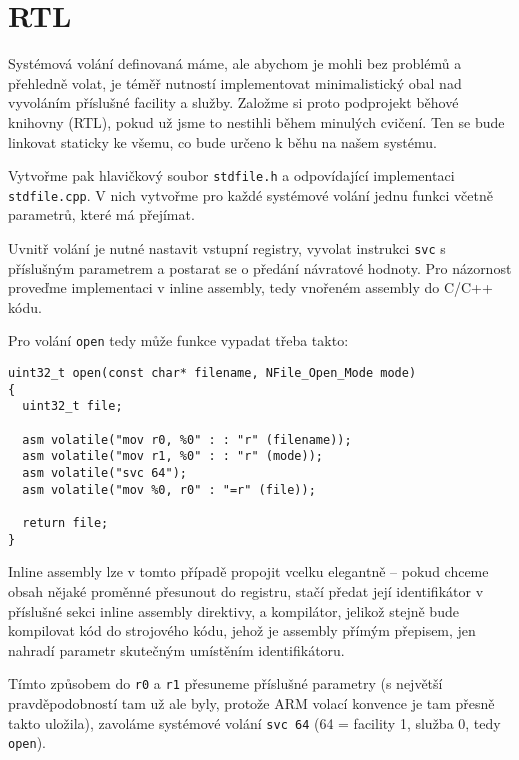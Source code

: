 \documentclass{article}
\begin{document}
\section{RTL}

Systémová volání definovaná máme, ale abychom je mohli bez problémů a přehledně volat, je téměř nutností implementovat minimalistický obal nad vyvoláním příslušné facility a služby. Založme si proto podprojekt běhové knihovny (RTL), pokud už jsme to nestihli během minulých cvičení. Ten se bude linkovat staticky ke všemu, co bude určeno k běhu na našem systému.

Vytvořme pak hlavičkový soubor \texttt{stdfile.h} a odpovídající implementaci \texttt{stdfile.cpp}. V nich vytvořme pro každé systémové volání jednu funkci včetně parametrů, které má přejímat.

Uvnitř volání je nutné nastavit vstupní registry, vyvolat instrukci \texttt{svc} s příslušným parametrem a postarat se o předání návratové hodnoty. Pro názornost proveďme implementaci v inline assembly, tedy vnořeném assembly do C/C++ kódu.

Pro volání \texttt{open} tedy může funkce vypadat třeba takto:
\begin{lstlisting}
uint32_t open(const char* filename, NFile_Open_Mode mode)
{
  uint32_t file;

  asm volatile("mov r0, %0" : : "r" (filename));
  asm volatile("mov r1, %0" : : "r" (mode));
  asm volatile("svc 64");
  asm volatile("mov %0, r0" : "=r" (file));

  return file;
}
\end{lstlisting}
Inline assembly lze v tomto případě propojit vcelku elegantně -- pokud chceme obsah nějaké proměnné přesunout do registru, stačí předat její identifikátor v příslušné sekci inline assembly direktivy, a kompilátor, jelikož stejně bude kompilovat kód do strojového kódu, jehož je assembly přímým přepisem, jen nahradí parametr skutečným umístěním identifikátoru.

Tímto způsobem do \texttt{r0} a \texttt{r1} přesuneme příslušné parametry (s největší pravděpodobností tam už ale byly, protože ARM volací konvence je tam přesně takto uložila), zavoláme systémové volání \texttt{svc 64} (64 = facility 1, služba 0, tedy \texttt{open}).
\end{document}
